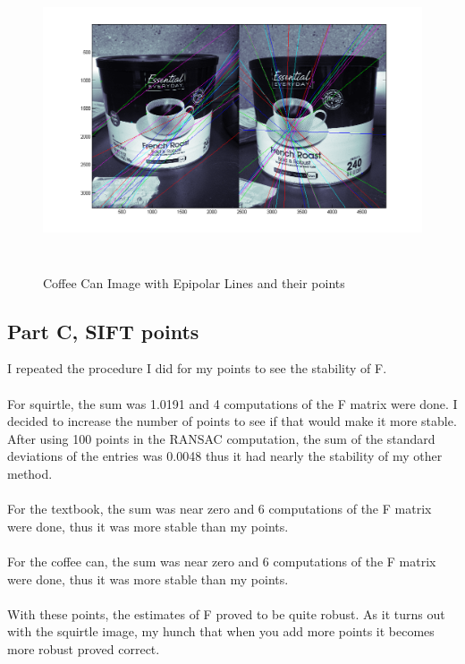 \documentclass[11pt,psfig]{article}
\begin{document}
\begin{figure}[H]
\centering
\includegraphics[height=3.5in]{coffeeCan_prob2Epipolar2.png}
\caption{Coffee Can Image with Epipolar Lines and their points}
\label{p2h}
\end{figure}

\newpage

\subsection*{Part C, SIFT points}

I repeated the procedure I did for my points to see the stability of F. \\
\\
For squirtle, the sum was 1.0191 and 4 computations of the F matrix were done. I decided to increase the number of points to see if that would make it more stable. After using 100 points in the RANSAC computation, the sum of the standard deviations of the entries was 0.0048 thus it had nearly the stability of my other method. \\
\\
For the textbook, the sum was near zero and 6 computations of the F matrix were done, thus it was more stable than my points.\\
\\
For the coffee can, the sum was near zero and 6 computations of the F matrix were done, thus it was more stable than my points. \\
\\
With these points, the estimates of F proved to be quite robust. As it turns out with the squirtle image, my hunch that when you add more points it becomes more robust proved correct. 
\end{document}
